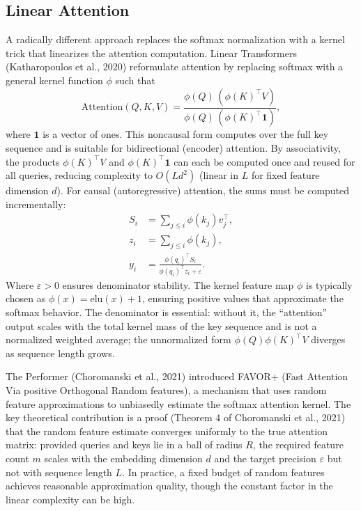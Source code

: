 \documentclass[10pt,twocolumn]{article}
\begin{document}
\subsection{Linear Attention}\label{linear-attention}

A radically different approach replaces the softmax normalization with a kernel trick that linearizes the attention computation. Linear Transformers (Katharopoulos et al., 2020) reformulate attention by replacing softmax with a general kernel function $\phi$ such that
\begin{equation*}
\text{Attention}(Q, K, V) = \frac{\phi(Q)\,(\phi(K)^\top V)}{\phi(Q)\,(\phi(K)^\top \mathbf{1})},
\end{equation*}
where $\mathbf{1}$ is a vector of ones. This noncausal form computes over the full key sequence and is suitable for bidirectional (encoder) attention. By associativity, the products $\phi(K)^\top V$ and $\phi(K)^\top \mathbf{1}$ can each be computed once and reused for all queries, reducing complexity to $O(L d^2)$ (linear in $L$ for fixed feature dimension $d$). For causal (autoregressive) attention, the sums must be computed incrementally:
\begin{equation*}
\begin{aligned}
S_i &= \sum_{j\le i}\phi(k_j)v_j^\top,\\
z_i &= \sum_{j\le i}\phi(k_j),\\
y_i &= \frac{\phi(q_i)^\top S_i}{\phi(q_i)^\top z_i+\varepsilon}.
\end{aligned}
\end{equation*}
Where $\varepsilon>0$ ensures denominator stability. The kernel feature map $\phi$ is typically chosen as $\phi(x) = \text{elu}(x) + 1$, ensuring positive values that approximate the softmax behavior. The denominator is essential: without it, the ``attention'' output scales with the total kernel mass of the key sequence and is not a normalized weighted average; the unnormalized form $\phi(Q)\phi(K)^\top V$ diverges as sequence length grows.

The Performer (Choromanski et al., 2021) introduced FAVOR+ (Fast Attention Via positive Orthogonal Random features), a mechanism that uses random feature approximations to unbiasedly estimate the softmax attention kernel. The key theoretical contribution is a proof (Theorem 4 of Choromanski et al., 2021) that the random feature estimate converges uniformly to the true attention matrix: provided queries and keys lie in a ball of radius $R$, the required feature count $m$ scales with the embedding dimension $d$ and the target precision $\varepsilon$ but not with sequence length $L$. In practice, a fixed budget of random features achieves reasonable approximation quality, though the constant factor in the linear complexity can be high.
\end{document}
